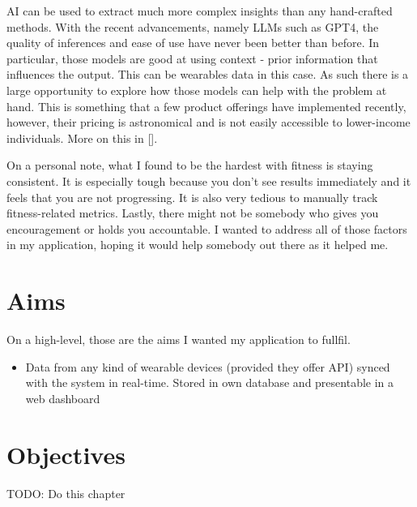 \par AI can be used to extract much more complex insights than any hand-crafted methods. With the recent advancements, namely LLMs such as GPT4, the quality of inferences and ease of use have never been better than before. In particular, those models are good at using context - prior information that influences the output. This can be wearables data in this case. As such there is a large opportunity to explore how those models can help with the problem at hand. This is something that a few product offerings have implemented recently, however, their pricing is astronomical and is not easily accessible to lower-income individuals. More on this in [].


On a personal note, what I found to be the hardest with fitness is staying consistent. It is especially tough because you don't 
see results immediately and it feels that you are not progressing. It is also very tedious to manually track fitness-related metrics.
Lastly, there might not be somebody who gives you encouragement or holds you accountable. I wanted to address all of those factors in my application, hoping it would help somebody out there as it helped me.
\section{Aims}
On a high-level, those are the aims I wanted my application to fullfil.
\begin{itemize}
    \item {Data from any kind of wearable devices (provided they offer API) synced with the system in real-time. Stored in own database and presentable in a web dashboard}
\end{itemize}
\section{Objectives}


TODO: Do this chapter
